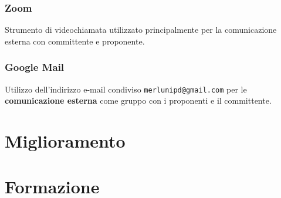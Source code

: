 \subsubsection{Zoom}
Strumento di videochiamata utilizzato principalmente per la comunicazione esterna con committente e proponente.

\subsubsection{Google Mail}
Utilizzo dell'indirizzo e-mail condiviso \texttt{merlunipd@gmail.com} per le \textbf{comunicazione esterna} come gruppo con i proponenti e il committente.

\section{Miglioramento}

\section{Formazione}